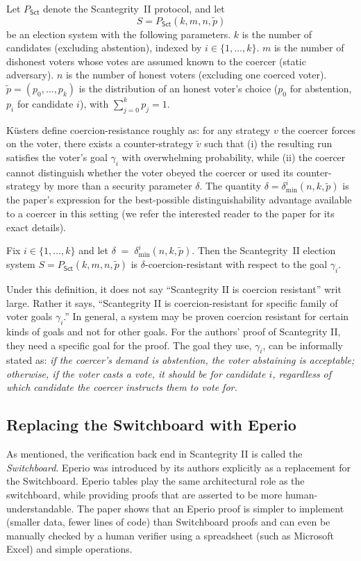 Let $P_{\mathsf{Sct}}$ denote the Scantegrity~II protocol, and let
\[
S = P_{\mathsf{Sct}}(k,m,n,\tilde p)
\]
be an election system with the following parameters. $k$ is the number of candidates (excluding abstention), indexed by $i\in\{1,\dots,k\}$. $m$ is the number of dishonest voters whose votes are assumed known to the coercer (static adversary). $n$ is the number of honest voters (excluding one coerced voter). $\tilde p=(p_0,\dots,p_k)$ is the distribution of an honest voter's choice ($p_0$ for abstention, $p_i$ for candidate $i$), with $\sum_{j=0}^k p_j=1$.


K{\"u}sters \etal define coercion-resistance roughly as: for any strategy $v$ the coercer forces on the voter, there exists a counter-strategy $\tilde v$ such that (i) the resulting run satisfies the voter's goal $\gamma_i$ with overwhelming probability, while (ii) the coercer cannot distinguish whether the voter obeyed the coercer or used its counter-strategy by more than a security parameter $\delta$. The quantity $\delta=\delta^i_{\min}(n,k,\tilde p)$ is the paper's expression for the best-possible distinguishability advantage available to a coercer in this setting (we refer the interested reader to the paper for its exact details).

\begin{theorem}
Fix $i\in\{1,\dots,k\}$ and let $\delta \;=\; \delta^i_{\min}(n,k,\tilde p).$ Then the Scantegrity~II election system $S=P_{\mathsf{Sct}}(k,m,n,\tilde p)$ is
$\delta$-coercion-resistant with respect to the goal $\gamma_i$.
\end{theorem}


Under this definition, it does not say ``Scantegrity II is coercion resistant'' writ large. Rather it says, ``Scantegrity II is coercion-resistant for specific family of voter goals $\gamma_i$.'' In general, a system may be proven coercion resistant for certain kinds of goals and not for other goals. For the authors' proof of Scantegrity II, they need a specific goal for the proof. The goal they use, $\gamma_i$, can be informally stated as: \textit{if the coercer’s demand is abstention, the voter abstaining is acceptable; otherwise, if the voter casts a vote, it should be for candidate $i$, regardless of which candidate the coercer instructs them to vote for.}


\subsection{Replacing the Switchboard with Eperio} 
\label{sec:eperio-coercion}
As mentioned, the verification back end in Scantegrity II is called the {\em Switchboard}. Eperio was introduced by its authors explicitly as a replacement for the Switchboard. Eperio tables play the same architectural role as the switchboard, while providing proofs that are asserted to be more human-understandable. The paper shows that an Eperio proof is simpler to implement (smaller data, fewer lines of code) than Switchboard proofs and can even be manually checked by a human verifier using a spreadsheet (such as Microsoft Excel) and simple operations.


